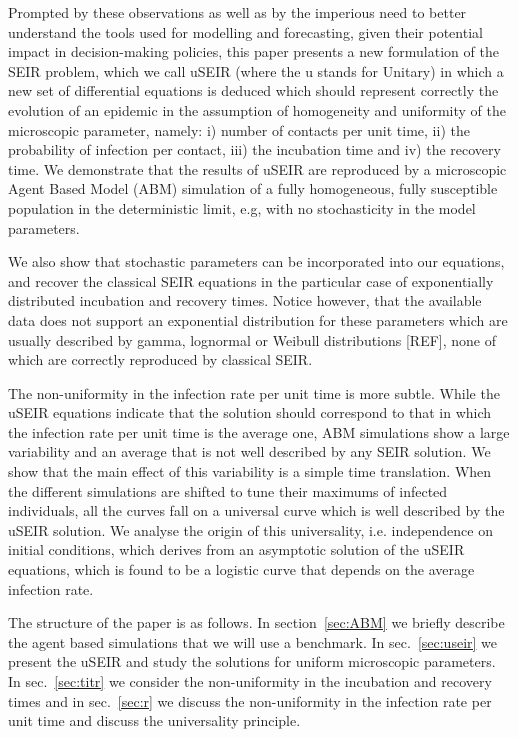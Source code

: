 \documentclass[a4paper,oneside,11pt]{article}
\begin{document}
Prompted by these observations as well as by the imperious need to better understand the tools used for modelling and forecasting, given their potential impact in decision-making policies, this paper presents a new formulation of the SEIR problem, which we call uSEIR (where the u stands for Unitary) in which a new set of differential equations is deduced which should represent correctly the evolution of an epidemic in the assumption of homogeneity and uniformity of the microscopic parameter, namely: i) number of contacts per unit time, ii) the probability of infection per contact, iii) the incubation time and iv) the recovery time. We demonstrate that the results of uSEIR are reproduced by a microscopic Agent Based Model (ABM) simulation of a fully homogeneous, fully susceptible population in the deterministic limit, e.g, with no stochasticity in the model parameters. 

We also show that stochastic parameters can be incorporated into our equations, and recover the classical SEIR equations in the particular case of exponentially distributed incubation and recovery times. Notice however, that the available data does not support an exponential distribution for these parameters which are usually described by gamma, lognormal or Weibull distributions [REF], none of which are correctly reproduced by classical SEIR. 

The non-uniformity in the infection rate per unit time is more subtle. While the uSEIR equations indicate that the solution should correspond to that in which the infection rate per unit time is the average one, ABM simulations show a large variability and an average that is not well described by any 
SEIR solution. We show that the main effect of this variability is a simple time translation. When the different simulations are shifted to tune their maximums of infected individuals, all the curves fall on a universal curve which is well described by the uSEIR solution. We analyse the origin of this universality, i.e. independence on initial conditions, which derives from an asymptotic solution of the uSEIR equations, which is found to be a logistic curve that depends on the average infection rate. 

The structure of the paper is as follows. In section~\ref{sec:ABM} we briefly describe the agent based simulations that we will use a benchmark.
In sec.~\ref{sec:useir} we present the uSEIR and study the solutions for uniform microscopic parameters. In sec.~\ref{sec:titr} we consider the
non-uniformity in the incubation and recovery times and in sec.~\ref{sec:r} we discuss the non-uniformity in the infection rate per unit time and discuss the universality principle. 
\end{document}
